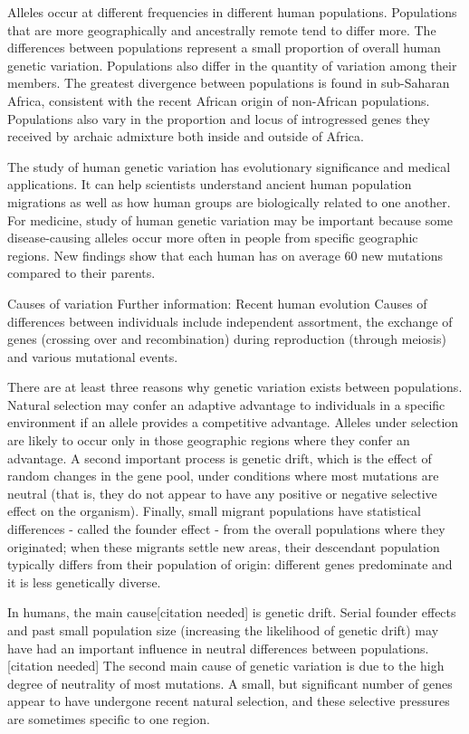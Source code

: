 Alleles occur at different frequencies in different human populations. Populations that are more geographically and ancestrally remote tend to differ more. The differences between populations represent a small proportion of overall human genetic variation. Populations also differ in the quantity of variation among their members. The greatest divergence between populations is found in sub-Saharan Africa, consistent with the recent African origin of non-African populations. Populations also vary in the proportion and locus of introgressed genes they received by archaic admixture both inside and outside of Africa.

The study of human genetic variation has evolutionary significance and medical applications. It can help scientists understand ancient human population migrations as well as how human groups are biologically related to one another. For medicine, study of human genetic variation may be important because some disease-causing alleles occur more often in people from specific geographic regions. New findings show that each human has on average 60 new mutations compared to their parents.

Causes of variation
Further information: Recent human evolution
Causes of differences between individuals include independent assortment, the exchange of genes (crossing over and recombination) during reproduction (through meiosis) and various mutational events.

There are at least three reasons why genetic variation exists between populations. Natural selection may confer an adaptive advantage to individuals in a specific environment if an allele provides a competitive advantage. Alleles under selection are likely to occur only in those geographic regions where they confer an advantage. A second important process is genetic drift, which is the effect of random changes in the gene pool, under conditions where most mutations are neutral (that is, they do not appear to have any positive or negative selective effect on the organism). Finally, small migrant populations have statistical differences - called the founder effect - from the overall populations where they originated; when these migrants settle new areas, their descendant population typically differs from their population of origin: different genes predominate and it is less genetically diverse.

In humans, the main cause{[}citation needed{]} is genetic drift. Serial founder effects and past small population size (increasing the likelihood of genetic drift) may have had an important influence in neutral differences between populations.{[}citation needed{]} The second main cause of genetic variation is due to the high degree of neutrality of most mutations. A small, but significant number of genes appear to have undergone recent natural selection, and these selective pressures are sometimes specific to one region.

